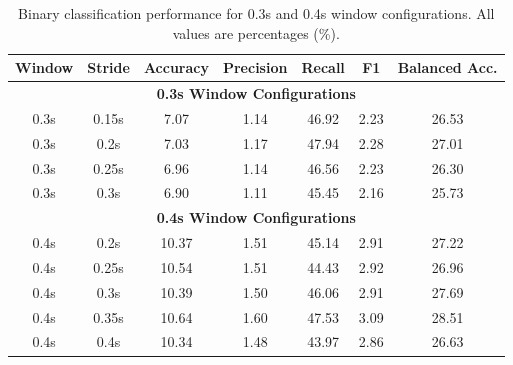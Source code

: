 \documentclass[11pt]{article}
\begin{document}
\begin{table}[H]
    \caption{Binary classification performance for 0.3s and 0.4s window configurations. All values are percentages (\%).}
    \centering
    \label{tab:binary-performance-0.3-0.4}
    \scriptsize
    \setlength{\tabcolsep}{3pt}
    \begin{tabular}{|c|c|c|c|c|c|c|}
        \hline
        \textbf{Window} & \textbf{Stride} & \textbf{Accuracy} & \textbf{Precision} & \textbf{Recall} & \textbf{F1} & \textbf{Balanced Acc.} \\
        \hline
        \multicolumn{7}{|c|}{\textbf{0.3s Window Configurations}} \\
        \hline
        0.3s & 0.15s & 7.07 & 1.14 & 46.92 & 2.23 & 26.53 \\
        \hline
        0.3s & 0.2s & 7.03 & 1.17 & 47.94 & 2.28 & 27.01 \\
        \hline
        0.3s & 0.25s & 6.96 & 1.14 & 46.56 & 2.23 & 26.30 \\
        \hline
        0.3s & 0.3s & 6.90 & 1.11 & 45.45 & 2.16 & 25.73 \\
        \hline
        \multicolumn{7}{|c|}{\textbf{0.4s Window Configurations}} \\
        \hline
        0.4s & 0.2s & 10.37 & 1.51 & 45.14 & 2.91 & 27.22 \\
        \hline
        0.4s & 0.25s & 10.54 & 1.51 & 44.43 & 2.92 & 26.96 \\
        \hline
        0.4s & 0.3s & 10.39 & 1.50 & 46.06 & 2.91 & 27.69 \\
        \hline
        0.4s & 0.35s & 10.64 & 1.60 & 47.53 & 3.09 & 28.51 \\
        \hline
        0.4s & 0.4s & 10.34 & 1.48 & 43.97 & 2.86 & 26.63 \\
        \hline
    \end{tabular}
\end{table}
\end{document}
